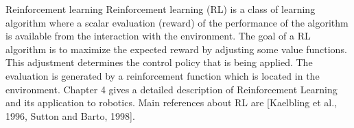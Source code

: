  
 Reinforcement learning
 Reinforcement learning (RL) is a class of learning algorithm where a
 scalar evaluation (reward) of the performance of the algorithm is available from the interaction with the environment. The goal of a RL
algorithm is to maximize the expected reward by adjusting some value
 functions. This adjustment determines the control policy that is being
 applied. The evaluation is generated by a reinforcement function which
 is located in the environment. Chapter 4 gives a detailed description
 of Reinforcement Learning and its application to robotics. Main references about RL are [Kaelbling et al., 1996, Sutton and Barto, 1998].